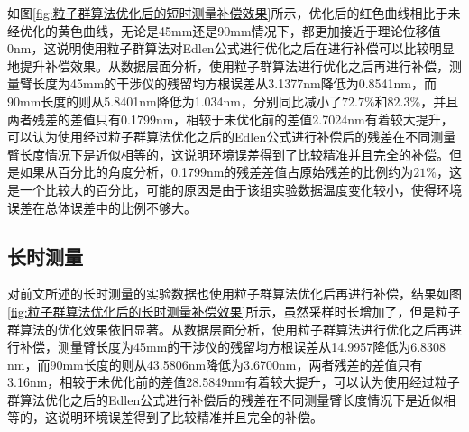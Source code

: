 如图\ref{fig:粒子群算法优化后的短时测量补偿效果}所示，优化后的红色曲线相比于未经优化的黄色曲线，无论是45mm还是90mm情况下，都更加接近于理论位移值0nm，这说明使用粒子群算法对Edlen公式进行优化之后在进行补偿可以比较明显地提升补偿效果。从数据层面分析，使用粒子群算法进行优化之后再进行补偿，测量臂长度为45mm的干涉仪的残留均方根误差从3.1377nm降低为0.8541nm，而90mm长度的则从5.8401nm降低为1.034nm，分别同比减小了$72.7\%$和$82.3\%$，并且两者残差的差值只有0.1799nm，相较于未优化前的差值2.7024nm有着较大提升，可以认为使用经过粒子群算法优化之后的Edlen公式进行补偿后的残差在不同测量臂长度情况下是近似相等的，这说明环境误差得到了比较精准并且完全的补偿。但是如果从百分比的角度分析，0.1799nm的残差差值占原始残差的比例约为$21\%$，这是一个比较大的百分比，可能的原因是由于该组实验数据温度变化较小，使得环境误差在总体误差中的比例不够大。

\subsection{长时测量}
对前文所述的长时测量的实验数据也使用粒子群算法优化后再进行补偿，结果如图\ref{fig:粒子群算法优化后的长时测量补偿效果}所示，虽然采样时长增加了，但是粒子群算法的优化效果依旧显著。从数据层面分析，使用粒子群算法进行优化之后再进行补偿，测量臂长度为45mm的干涉仪的残留均方根误差从14.9957降低为6.8308 nm，而90mm长度的则从43.5806nm降低为3.6700nm，两者残差的差值只有3.16nm，相较于未优化前的差值28.5849nm有着较大提升，可以认为使用经过粒子群算法优化之后的Edlen公式进行补偿后的残差在不同测量臂长度情况下是近似相等的，这说明环境误差得到了比较精准并且完全的补偿。
